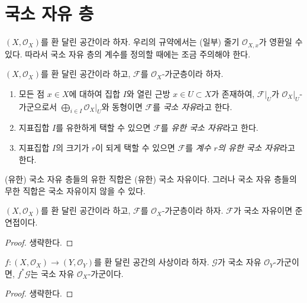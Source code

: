 \section{국소 자유 층}
\label{section-locally-free}

\noindent
$(X, \mathcal{O}_X)$를 환 달린 공간이라 하자.
우리의 규약에서는 (일부) 줄기 $\mathcal{O}_{X, x}$가 영환일 수 있다.
따라서 국소 자유 층의 계수를 정의할 때에는 조금 주의해야 한다.

\begin{definition}
\label{definition-locally-free}
$(X, \mathcal{O}_X)$를 환 달린 공간이라 하고,
$\mathcal{F}$를 $\mathcal{O}_X$-가군층이라 하자.
\begin{enumerate}
\item 모든 점 $x \in X$에 대하여 집합 $I$와 열린 근방
$x \in U \subset X$가 존재하여, $\mathcal{F}|_U$가
$\mathcal{O}_X|_U$-가군으로서
$\bigoplus_{i \in I} \mathcal{O}_X|_U$와 동형이면
$\mathcal{F}$를 {\it 국소 자유}라고 한다.
\item 지표집합 $I$를 유한하게 택할 수 있으면 $\mathcal{F}$를
{\it 유한 국소 자유}라고 한다.
\item 지표집합 $I$의 크기가 $r$이 되게 택할 수 있으면
$\mathcal{F}$를 {\it 계수 $r$의 유한 국소 자유}라고 한다.
\end{enumerate}
\end{definition}

\noindent
(유한) 국소 자유 층들의 유한 직합은 (유한) 국소 자유이다.
그러나 국소 자유 층들의 무한 직합은 국소 자유이지 않을 수 있다.

\begin{lemma}
\label{lemma-locally-free-quasi-coherent}
$(X, \mathcal{O}_X)$를 환 달린 공간이라 하고,
$\mathcal{F}$를 $\mathcal{O}_X$-가군층이라 하자.
$\mathcal{F}$가 국소 자유이면 준연접이다.
\end{lemma}

\begin{proof}
생략한다.
\end{proof}

\begin{lemma}
\label{lemma-pullback-locally-free}
$f : (X, \mathcal{O}_X) \to (Y, \mathcal{O}_Y)$를
환 달린 공간의 사상이라 하자. $\mathcal{G}$가 국소 자유
$\mathcal{O}_Y$-가군이면, $f^*\mathcal{G}$는 국소 자유
$\mathcal{O}_X$-가군이다.
\end{lemma}

\begin{proof}
생략한다.
\end{proof}


